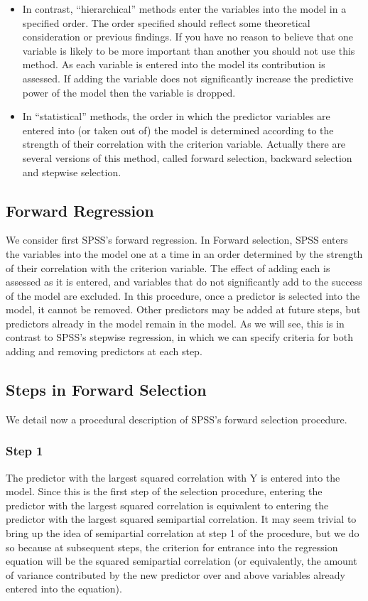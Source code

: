 \begin{itemize}
	\item In contrast, “hierarchical” methods enter the variables into the model in a specified order. The order specified should reflect some theoretical consideration or previous
	findings. If you have no reason to believe that one variable is likely to be more important than another you should not use this method. As each variable is entered into the model its contribution is assessed. If adding the variable does not significantly increase the predictive power of the model then the variable is
	dropped.
	
\item In “statistical” methods, the order in which the predictor variables are entered into (or taken out of) the model is determined according to the strength of their correlation with the criterion variable. Actually there are several versions of this method, called forward selection, backward selection and stepwise selection.
\end{itemize}


\subsection{Forward Regression}
We consider first SPSS’s forward regression. In Forward selection, SPSS enters the variables into the model one at a time in an
order determined by the strength of their correlation with the criterion variable. The effect of adding each is assessed as it is entered, and variables that do not significantly add to the success of the model are excluded. In this procedure, once a predictor is selected into the model, it cannot be removed. Other predictors may be added at future steps, but predictors already in the model remain in the model. As we will see, this is in contrast to SPSS’s stepwise regression, in which we can specify criteria for both adding and removing predictors at each step.

\subsection{Steps in Forward Selection}
We detail now a procedural description of SPSS’s forward selection procedure.

\subsubsection*{Step 1}
The predictor with the largest squared correlation with Y is entered into the model. Since this is the first step of the selection procedure, entering the predictor with the largest squared correlation is equivalent to entering the predictor with the largest squared semipartial correlation. It may seem trivial to bring up the idea of semipartial correlation at step 1 of the procedure, but we do so because at subsequent steps, the criterion for entrance into the regression equation will be the squared semipartial correlation (or equivalently, the amount of variance contributed by the new predictor over and above variables already entered into the equation).

